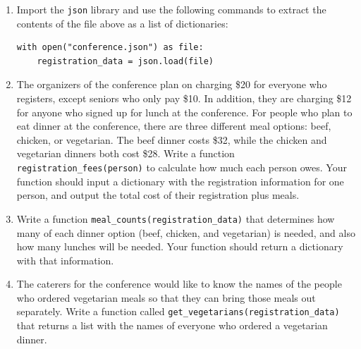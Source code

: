 \documentclass[12pt]{article}
\begin{document}
\begin{enumerate}
\item Import the \verb|json| library and use the following commands to extract the contents of the file above as a list of dictionaries:
\begin{verbatim}
with open("conference.json") as file:
    registration_data = json.load(file)
\end{verbatim}

\item The organizers of the conference plan on charging \$20 for everyone who registers, except seniors who only pay \$10.  In addition, they are charging \$12 for anyone who signed up for lunch at the conference.  For people who plan to eat dinner at the conference, there are three different meal options: beef, chicken, or vegetarian.  The beef dinner costs \$32, while the chicken and vegetarian dinners both cost \$28. Write a function \verb|registration_fees(person)| to calculate how much each person owes.  Your function should input a dictionary with the registration information for one person, and output the total cost of their registration plus meals. 

\item Write a function \verb|meal_counts(registration_data)| that determines how many of each dinner option (beef, chicken, and vegetarian) is needed, and also how many lunches will be needed. Your function should return a dictionary with that information. 

\item The caterers for the conference would like to know the names of the people who ordered vegetarian meals so that they can bring those meals out separately.  Write a function called \verb|get_vegetarians(registration_data)| that returns a list with the names of everyone who ordered a vegetarian dinner. 



\end{enumerate}

%
\end{document}
